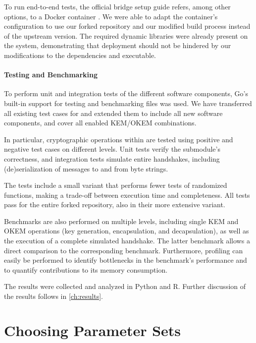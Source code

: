 To run end-to-end tests, the official bridge setup guide \cite{tor-bridge-setup} refers, among other options, to a Docker container \cite{tor-bridge-docker}.
We were able to adapt the container's configuration to use our forked repository and our modified build process instead of the upstream version. The required dynamic libraries were already present on the system, demonstrating that deployment should not be hindered by our modifications to the dependencies and executable.

\paragraph{Testing and Benchmarking}

To perform unit and integration tests of the different software components, Go's built-in support for testing and benchmarking files was used. We have transferred all existing test cases for \obfsfour{} and extended them to include all new software components, and cover all enabled KEM/OKEM combinations.

In particular, cryptographic operations within \drivel{} are tested using positive and negative test cases on different levels. Unit tests verify the submodule's correctness, and integration tests simulate entire handshakes, including (de)serialization of messages to and from byte strings.

The tests include a small variant that performs fewer tests of randomized functions, making a trade-off between execution time and completeness. All tests pass for the entire forked repository, also in their more extensive variant. 

Benchmarks are also performed on multiple levels, including single KEM and OKEM operations (key generation, encapsulation, and decapsulation), as well as the execution of a complete simulated handshake. The latter benchmark allows a direct comparison to the corresponding \obfsfour{} benchmark. Furthermore, profiling can easily be performed to identify bottlenecks in the benchmark's performance and to quantify contributions to its memory consumption.

The results were collected and analyzed in Python and R. Further discussion of the results follows in \cref{ch:results}.

\section{Choosing Parameter Sets} \label{sec:parameters}

